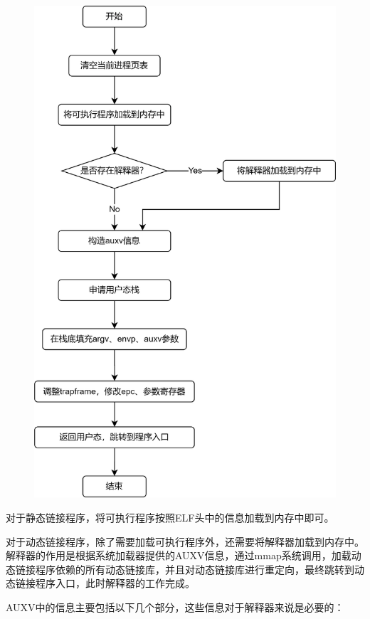 \documentclass[UTF8,a4paper,10pt]{ctexart}
\begin{document}
\begin{figure}[H]
  \centering
  \includegraphics[scale=0.15]{image/loader01.png}
\end{figure}


对于静态链接程序，将可执行程序按照ELF头中的信息加载到内存中即可。

对于动态链接程序，除了需要加载可执行程序外，还需要将解释器加载到内存中。解释器的作用是根据系统加载器提供的AUXV信息，通过mmap系统调用，加载动态链接程序依赖的所有动态链接库，并且对动态链接库进行重定向，最终跳转到动态链接程序入口，此时解释器的工作完成。

AUXV中的信息主要包括以下几个部分，这些信息对于解释器来说是必要的：
\end{document}
